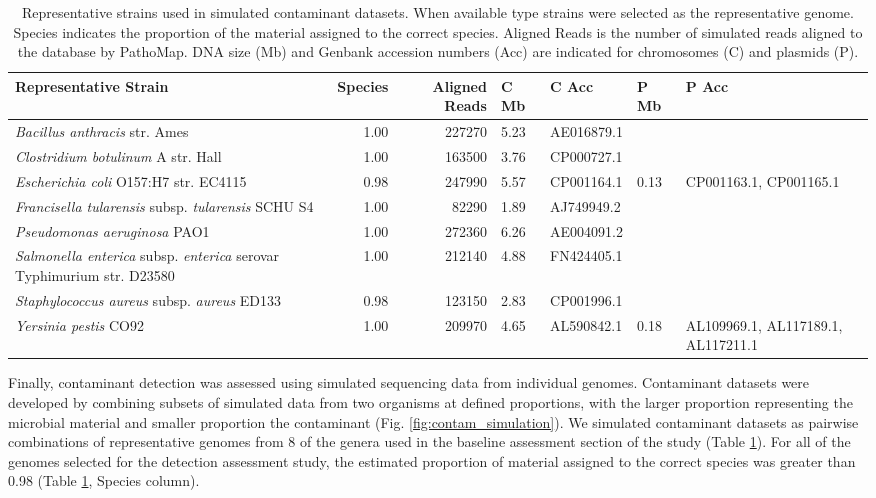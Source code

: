 \documentclass[fleqn,10pt,lineno]{wlpeerj}\usepackage[]{graphicx}\usepackage[]{color}
\begin{document}
\begin{table}[ht]
\centering
\begin{tabular}{lrrllll}
  \hline
Representative Strain & Species & Aligned Reads & C Mb & C Acc & P Mb & P Acc \\ 
  \hline
\textit{Bacillus anthracis} str. Ames & 1.00 & 227270 & 5.23 & AE016879.1 &  &  \\ 
  \textit{Clostridium botulinum} A str. Hall & 1.00 & 163500 & 3.76 & CP000727.1 &  &  \\ 
  \textit{Escherichia coli} O157:H7 str. EC4115 & 0.98 & 247990 & 5.57 & CP001164.1 & 0.13 & CP001163.1, CP001165.1 \\ 
  \textit{Francisella tularensis} subsp. \textit{tularensis} SCHU S4 & 1.00 & 82290 & 1.89 & AJ749949.2 &  &  \\ 
  \textit{Pseudomonas aeruginosa} PAO1 & 1.00 & 272360 & 6.26 & AE004091.2 &  &  \\ 
  \textit{Salmonella enterica} subsp. \textit{enterica} serovar Typhimurium str. D23580 & 1.00 & 212140 & 4.88 & FN424405.1 &  &  \\ 
  \textit{Staphylococcus aureus} subsp. \textit{aureus} ED133 & 0.98 & 123150 & 2.83 & CP001996.1 &  &  \\ 
  \textit{Yersinia pestis} CO92 & 1.00 & 209970 & 4.65 & AL590842.1 & 0.18 & AL109969.1, AL117189.1, AL117211.1 \\ 
   \hline
\end{tabular}
\caption{Representative strains used in simulated contaminant datasets. When available type strains were selected as the representative genome. Species indicates the proportion of the material assigned to the correct species. Aligned Reads is the number of simulated reads aligned to the database by PathoMap. DNA size (Mb) and Genbank accession numbers (Acc) are indicated for chromosomes (C) and plasmids (P).} 
\label{tab:contam_table}
\end{table}



Finally, contaminant detection was assessed using simulated sequencing data from individual genomes.
Contaminant datasets were developed by combining subsets of simulated data from two organisms at defined proportions,
with the larger proportion representing the microbial material and smaller proportion the contaminant (Fig. \ref{fig:contam_simulation}).
We simulated contaminant datasets as pairwise combinations of representative genomes from 8 of the genera used in the baseline assessment section of the study (Table \ref{tab:contam_table}).
For all of the genomes selected for the detection assessment study, the estimated proportion of material assigned to the correct species was greater than 0.98 (Table \ref{tab:contam_table}, Species column).
\end{document}
